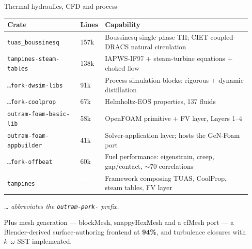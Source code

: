 \documentclass[aspectratio=169,11pt]{beamer}
\newcommand{\caveat}[1]{{\footnotesize\color{opmuted}\textit{#1}}}
\begin{document}
\begin{frame}{Thermal-hydraulics, CFD and process}
  \footnotesize
  \setlength{\tabcolsep}{4pt}
  \begin{tabular}{@{}p{}p{}p{}@{}}
    \toprule
    \textbf{Crate} & \textbf{Lines} & \textbf{Capability} \\
    \midrule
    \texttt{tuas\_boussinesq} & 157k & Boussinesq single-phase TH; CIET coupled-DRACS natural circulation \\
    \texttt{tampines-steam-tables} & 138k & IAPWS-IF97 \cite{iapws97} + steam-turbine equations + choked flow \\
    \texttt{\ldots fork-dwsim-libs} & 91k & Process-simulation blocks; rigorous + dynamic distillation \cite{luyben2013} \\
    \texttt{\ldots fork-coolprop} & 67k & Helmholtz-EOS properties, 137 fluids \cite{coolprop} \\
    \texttt{outram-foam-basic-lib} & 58k & OpenFOAM primitive + FV layer, Layers 1--4 \cite{openfoam} \\
    \texttt{outram-foam-appbuilder} & 41k & Solver-application layer; hosts the GeN-Foam port \\
    \texttt{\ldots fork-offbeat} & 60k & Fuel performance: eigenstrain, creep, gap/contact, $\sim$70 correlations \\
    \texttt{tampines} & --- & Framework composing TUAS, CoolProp, steam tables, FV layer \\
    \bottomrule
  \end{tabular}
  \vspace{0.8em}

  \caveat{\ldots{} abbreviates the \texttt{outram-park-} prefix.}
  \vspace{0.4em}

  Plus mesh generation --- blockMesh, snappyHexMesh and a cfMesh port --- a
  Blender-derived surface-authoring frontend at \textbf{94\%}, and turbulence
  closures with $k$--$\omega$ SST implemented.
\end{frame}
\end{document}
